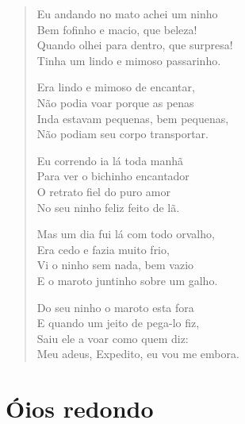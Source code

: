 \begin{verse}
Eu andando no mato achei um ninho\\
Bem fofinho e macio, que beleza!\\
Quando olhei para dentro, que surpresa!\\
Tinha um lindo e mimoso passarinho.

Era lindo e mimoso de encantar,\\
Não podia voar porque as penas\\
Inda estavam pequenas, bem pequenas,\\
Não podiam seu corpo transportar.

Eu correndo ia lá toda manhã\\
Para ver o bichinho encantador\\
O retrato fiel do puro amor\\
No seu ninho feliz feito de lã.

Mas um dia fui lá com todo orvalho,\\
Era cedo e fazia muito frio,\\
Vi o ninho sem nada, bem vazio\\
E o maroto juntinho sobre um galho.

Do seu ninho o maroto esta fora\\
E quando um jeito de pega-lo fiz,\\
Saiu ele a voar como quem diz:\\
Meu adeus, Expedito, eu vou me embora.
\end{verse}

\chapter{Óios redondo}

